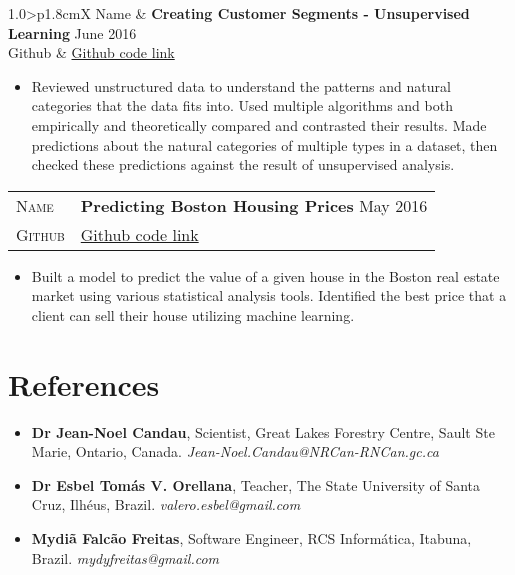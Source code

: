\documentclass[10pt, a4paper, oneside, final]{scrartcl} %
\newcommand{\gray}{\rowcolor[gray]{.90}} %
\begin{document}
\begin{center}
\begin{tabularx}{1.0\linewidth}{>{\raggedleft\scshape}p{1.8cm}X}
\gray Name & \textbf{Creating Customer Segments - Unsupervised Learning} \hfill June 2016\\
\gray Github & \href{https://github.com/thalles753/machine-learning/tree/master/projects/creating_customer_segments}{Github code link}
\end{tabularx}
\end{center}

\begin{itemize}\itemsep1.5pt
\item Reviewed unstructured data to understand the patterns and natural categories that the data fits into.
Used multiple algorithms and both empirically and theoretically compared and contrasted their results.
Made predictions about the natural categories of multiple types in a dataset, then checked these
predictions against the result of unsupervised analysis.
\end{itemize}

\begin{center}
\begin{tabularx}{1.0\linewidth}{>{\raggedleft\scshape}p{1.8cm}X}
\gray Name & \textbf{Predicting Boston Housing Prices} \hfill May 2016\\
\gray Github & \href{https://github.com/thalles753/machine-learning/tree/master/projects/boston_housing}{Github code link}
\end{tabularx}
\end{center}

\begin{itemize}\itemsep1.5pt
\item Built a model to predict the value of a given house in the Boston real estate market using various statistical analysis tools. Identified the best price that a client can sell their house utilizing machine learning.
\end{itemize}


\section{References}

\begin{itemize} \itemsep2pt \parskip0pt 
\item \textbf{Dr Jean-Noel Candau}, Scientist, Great Lakes Forestry Centre, Sault Ste Marie, Ontario, Canada. \textit{Jean-Noel.Candau@NRCan-RNCan.gc.ca}

\item \textbf{Dr Esbel Tomás V. Orellana}, Teacher, The State University of Santa Cruz, Ilhéus, Brazil. \textit{valero.esbel@gmail.com} 

\item \textbf{Mydiã Falcão Freitas}, Software Engineer, RCS Informática, Itabuna, Brazil. \textit{mydyfreitas@gmail.com} 
\end{itemize}

\end{document}
